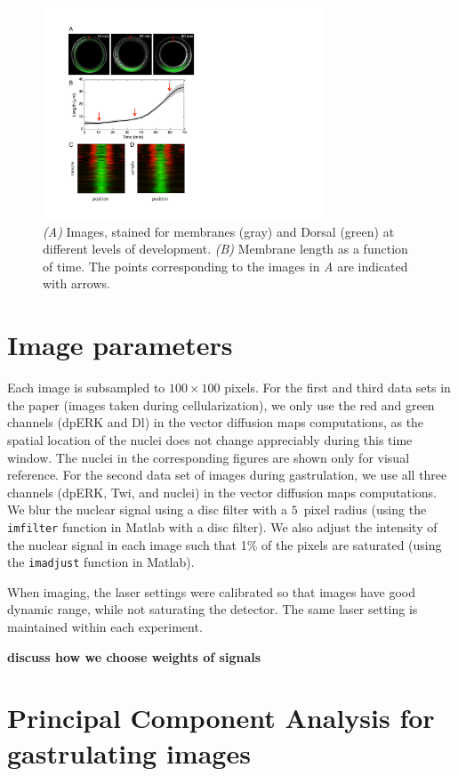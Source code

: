 \documentclass[12pt]{article}
\begin{document}
\begin{figure}[H]
\includegraphics[width=8.4cm, trim=0cm 5.6cm 0cm 0cm, clip]{SI_fig6}
\caption{{\it (A)} Images, stained for membranes (gray) and Dorsal (green) at different levels of development. {\it (B)} Membrane length as a function of time. The points corresponding to the images in {\it A} are indicated with arrows.}
\label{fig:membrane_compare}
\end{figure}

\section{Image parameters}

Each image is subsampled to $100 \times 100$ pixels.
%
For the first and third data sets in the paper (images taken during cellularization), we only use the red and green channels (dpERK and Dl) in the vector diffusion maps computations, as the spatial location of the nuclei does not change appreciably during this time window.
%
The nuclei in the corresponding figures are shown only for visual reference.
%
For the second data set of images during gastrulation, we use all three channels (dpERK, Twi, and nuclei) in the vector diffusion maps computations.
%
We blur the nuclear signal using a disc filter with a $5$~pixel radius (using the \texttt{imfilter} function in Matlab with a disc filter).
%
We also adjust the intensity of the nuclear signal in each image such that 1\% of the pixels are saturated (using the \texttt{imadjust} function in Matlab).

When imaging, the laser settings were calibrated so that images have good dynamic range, while not saturating the detector. 
% 
The same laser setting is maintained within each experiment. 

{\bf discuss how we choose weights of signals}

\section{Principal Component Analysis for gastrulating images}
\end{document}
